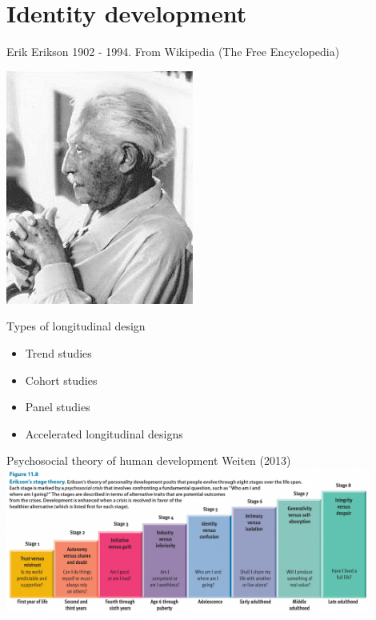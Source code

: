 \documentclass[
  ignorenonframetext,
  aspectratio=169,
]{beamer}
\providecommand{\tightlist}{%
  \setlength{\itemsep}{0pt}\setlength{\parskip}{0pt}}\usepackage{longtable,booktabs,array}
\begin{document}
\section{Identity development}\label{identity-development}

\begin{frame}{Erik Erikson}
\label{erik-erikson}
1902 - 1994. From Wikipedia (The Free Encyclopedia)

\begin{center}
\includegraphics{figs/Erik_Erikson.jpg}
\end{center}
\end{frame}

\begin{frame}{Types of longitudinal design}
\label{types-of-longitudinal-design}
\begin{itemize}[<+->]
\tightlist
\item
  Trend studies
\item
  Cohort studies
\item
  Panel studies
\item
  Accelerated longitudinal designs
\end{itemize}
\end{frame}

\begin{frame}{Psychosocial theory of human development}
\label{psychosocial-theory-of-human-development}
Weiten (2013)
\includegraphics[width=0.9\textwidth,height=\textheight]{figs/stages.png}
\end{frame}
\end{document}
